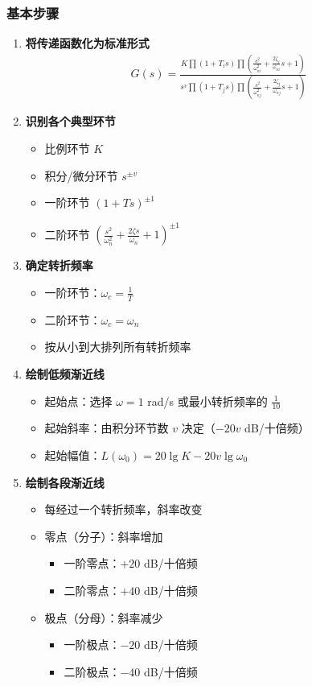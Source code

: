 \subsubsection{基本步骤}
\begin{enumerate}
    \item \textbf{将传递函数化为标准形式}
    \begin{align*}
    G(s) = \frac{K\prod(1+T_i s)\prod(\frac{s^2}{\omega_{ni}^2}+\frac{2\zeta_i}{\omega_{ni}}s+1)}{s^v\prod(1+T_j s)\prod(\frac{s^2}{\omega_{nj}^2}+\frac{2\zeta_j}{\omega_{nj}}s+1)}
    \end{align*}
    
    \item \textbf{识别各个典型环节}
    \begin{itemize}
        \item 比例环节 $K$
        \item 积分/微分环节 $s^{\pm v}$
        \item 一阶环节 $(1+Ts)^{\pm 1}$
        \item 二阶环节 $(\frac{s^2}{\omega_n^2}+\frac{2\zeta s}{\omega_n}+1)^{\pm 1}$
    \end{itemize}
    
    \item \textbf{确定转折频率}
    \begin{itemize}
        \item 一阶环节：$\omega_c = \frac{1}{T}$
        \item 二阶环节：$\omega_c = \omega_n$
        \item 按从小到大排列所有转折频率
    \end{itemize}
    
    \item \textbf{绘制低频渐近线}
    \begin{itemize}
        \item 起始点：选择 $\omega = 1$ rad/s 或最小转折频率的 $\frac{1}{10}$
        \item 起始斜率：由积分环节数 $v$ 决定（$-20v$ dB/十倍频）
        \item 起始幅值：$L(\omega_0) = 20\lg K - 20v\lg\omega_0$
    \end{itemize}
    
    \item \textbf{绘制各段渐近线}
    \begin{itemize}
        \item 每经过一个转折频率，斜率改变
        \item 零点（分子）：斜率增加
        \begin{itemize}
            \item 一阶零点：$+20$ dB/十倍频
            \item 二阶零点：$+40$ dB/十倍频
        \end{itemize}
        \item 极点（分母）：斜率减少
        \begin{itemize}
            \item 一阶极点：$-20$ dB/十倍频
            \item 二阶极点：$-40$ dB/十倍频
        \end{itemize}
    \end{itemize}
    

\end{enumerate}
